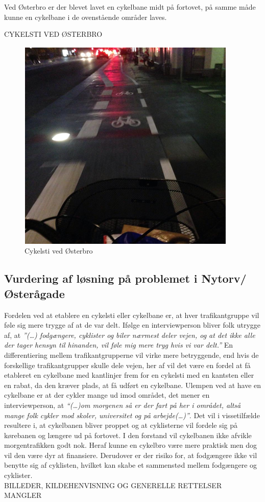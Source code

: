 Ved Østerbro er der blevet lavet en cykelbane midt på fortovet, på samme måde kunne en cykelbane i de ovenstående områder laves. 

CYKELSTI VED ØSTERBRO
\begin{figure}[htbp]
  \centering
  \begin{adjustbox}{max width=\textwidth}
    \includegraphics{figures/Billederogfigur/osterbro.png}
 \end{adjustbox}
  \caption{Cykelsti ved Østerbro}
   \label{fig:cykelsti_ved_osterbro}
\end{figure}


\subsection{Vurdering af løsning på problemet i Nytorv/Østerågade}
Fordelen ved at etablere en cykelsti eller cykelbane er, at hver trafikantgruppe vil føle sig mere trygge af at de var delt. Ifølge en interviewperson bliver folk utrygge af, at \emph{”(…) fodgængere, cyklister og biler nærmest deler vejen, og at det ikke alle der tager hensyn til hinanden, vil føle mig mere tryg hvis vi var delt.”} En differentiering mellem trafikantgrupperne vil virke mere betryggende, end hvis de forskellige trafikantgrupper skulle dele vejen, her af vil det være en fordel at få etableret en cykelbane med kantlinjer frem for en cykelsti med en kantsten eller en rabat, da den kræver plads, at få udført en cykelbane. Ulempen ved at have en cykelbane er at der cykler mange ud imod området, det mener en interviewperson, at \emph{“(…)om morgenen så er der fart på her i området, altså mange folk cykler mod skoler, universitet og på arbejde(…)”}. Det vil i vissetilfælde resultere i, at cykelbanen bliver proppet og at cyklisterne vil fordele sig på kørebanen og længere ud på fortovet. I den forstand vil cykelbanen ikke afvikle morgentrafikken godt nok. Heraf kunne en cykelbro være mere praktisk men dog vil den være dyr at finansiere.  Derudover er der risiko for, at fodgængere ikke vil benytte sig af cyklisten, hvilket kan skabe et sammenstød mellem fodgængere og cyklister.  
\\

BILLEDER, KILDEHENVISNING OG GENERELLE RETTELSER MANGLER
